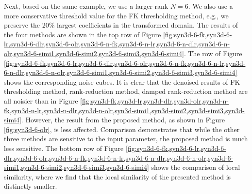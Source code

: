 Next, based on the same example, we use a larger rank $N=6$. We also use a more conservative threshold value for the FK thresholding method, e.g., we preserve the 20\% largest coefficients in the transformed domain. The results of the four methods are shown in the top row of Figure \ref{fig:syn3d-6-fk,syn3d-6-lr,syn3d-6-dlr,syn3d-6-olr,syn3d-6-n-fk,syn3d-6-n-lr,syn3d-6-n-dlr,syn3d-6-n-olr,syn3d-6-simi1,syn3d-6-simi2,syn3d-6-simi3,syn3d-6-simi4}. The  row of Figure \ref{fig:syn3d-6-fk,syn3d-6-lr,syn3d-6-dlr,syn3d-6-olr,syn3d-6-n-fk,syn3d-6-n-lr,syn3d-6-n-dlr,syn3d-6-n-olr,syn3d-6-simi1,syn3d-6-simi2,syn3d-6-simi3,syn3d-6-simi4} shows the corresponding noise cubes. It is clear that the denoised results of FK thresholding method, rank-reduction method, damped rank-reduction method are all noisier than  in Figure \ref{fig:syn3d-fk,syn3d-lr,syn3d-dlr,syn3d-olr,syn3d-n-fk,syn3d-n-lr,syn3d-n-dlr,syn3d-n-olr,syn3d-simi1,syn3d-simi2,syn3d-simi3,syn3d-simi4}. However, the result from the proposed method, as shown in Figure \ref{fig:syn3d-6-olr}, is less affected.  Comparison  demonstrates that while the other three methods are sensitive to the input parameter, the proposed method is much less sensitive. The bottom row of Figure \ref{fig:syn3d-6-fk,syn3d-6-lr,syn3d-6-dlr,syn3d-6-olr,syn3d-6-n-fk,syn3d-6-n-lr,syn3d-6-n-dlr,syn3d-6-n-olr,syn3d-6-simi1,syn3d-6-simi2,syn3d-6-simi3,syn3d-6-simi4} shows the comparison of local similarity, where we find that the local similarity of the presented method is distinctly smaller. 

